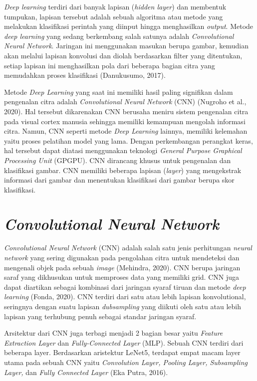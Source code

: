 \emph{Deep learning} terdiri dari banyak lapisan (\emph{hidden layer}) dan membentuk tumpukan, lapisan tersebut adalah sebuah algoritma atau metode yang melakukan klasifikasi perintah yang diinput hingga menghasilkan \emph{output}. Metode \emph{deep learning} yang sedang berkembang salah satunya adalah \emph{Convolutional Neural Network}. Jaringan ini menggunakan masukan berupa gambar, kemudian akan melalui lapisan konvolusi dan diolah berdasarkan filter yang ditentukan, setiap lapisan ini menghasilkan pola dari beberapa bagian citra yang memudahkan proses klasifikasi (Danukusumo, 2017).

Metode \emph{Deep Learning} yang saat ini memiliki hasil paling signifikan dalam pengenalan citra adalah \emph{Convolutional Neural Network} (CNN) (Nugroho et al., 2020). Hal tersebut dikarenakan CNN berusaha meniru sistem pengenalan citra pada visual cortex manusia sehingga memiliki kemampuan mengolah informasi citra. Namun, CNN seperti metode \emph{Deep Learning} lainnya, memiliki kelemahan yaitu proses pelatihan model yang lama. Dengan perkembangan perangkat keras, hal tersebut dapat diatasi menggunakan teknologi \emph{General Purpose Graphical Processing Unit} (GPGPU). CNN dirancang khusus untuk pengenalan dan klasifikasi gambar. CNN memiliki beberapa lapisan (\emph{layer}) yang mengekstrak informasi dari gambar dan menentukan klasifikasi dari gambar berupa skor klasifikasi.


\section{\emph{Convolutional Neural Network}}
\label{sec:cnn}

\emph{Convolutional Neural Network} (CNN) adalah salah satu jenis perhitungan \emph{neural network} yang sering digunakan pada pengolahan citra untuk mendeteksi dan mengenali objek pada sebuah \emph{image} (Mehindra, 2020). CNN berupa jaringan saraf yang dikhusukan untuk memproses data yang memiliki grid. CNN juga dapat diartikan sebagai kombinasi dari jaringan syaraf tiruan dan metode \emph{deep learning} (Fonda, 2020). CNN terdiri dari satu atau lebih lapisan konvolutional, seringnya dengan suatu lapisan \emph{dubsampling} yang diikuti oleh satu atau lebih lapisan yang terhubung penuh sebagai standar jaringan syaraf.

Arsitektur dari CNN juga terbagi menjadi 2 bagian besar yaitu \emph{Feature Extraction Layer} dan \emph{Fully-Connected Layer} (MLP). Sebuah CNN terdiri dari beberapa layer. Berdasarkan aristektur LeNet5, terdapat empat macam layer utama pada sebuah CNN yaitu \emph{Convolution Layer, Pooling Layer, Subsampling Layer,} dan \emph{Fully Connected Layer} (Eka Putra, 2016).

